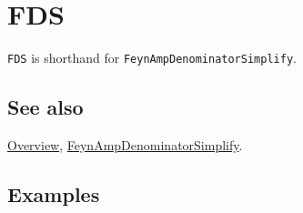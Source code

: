 \documentclass[../FeynCalcManual.tex]{subfiles}
\begin{document}
\hypertarget{fds}{%
\section{FDS}\label{fds}}

\texttt{FDS} is shorthand for \texttt{FeynAmpDenominatorSimplify}.

\subsection{See also}

\hyperlink{toc}{Overview},
\hyperlink{feynampdenominatorsimplify}{FeynAmpDenominatorSimplify}.

\subsection{Examples}
\end{document}
